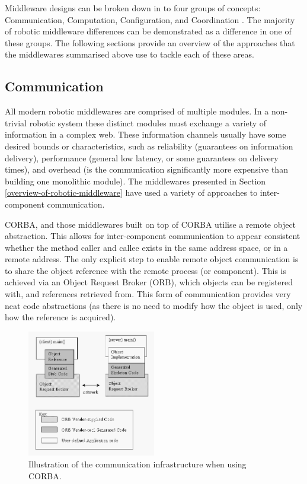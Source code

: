 \documentclass[../dissertation.tex]{subfiles}
\begin{document}

Middleware designs can be broken down in to four groups of concepts: Communication, Computation, Configuration, and Coordination \cite{brugali2010component}. The majority of robotic middleware differences can be demonstrated as a difference in one of these groups. The following sections provide an overview of the approaches that the middlewares summarised above use to tackle each of these areas.

\subsection{Communication}

All modern robotic middlewares are comprised of multiple modules. In a non-trivial robotic system these distinct modules must exchange a variety of information in a complex web. These information channels usually have some desired bounds or characteristics, such as reliability (guarantees on information delivery), performance (general low latency, or some guarantees on delivery times), and overhead (is the communication significantly more expensive than building one monolithic module). The middlewares presented in Section \ref{overview-of-robotic-middleware} have used a variety of approaches to inter-component communication.

CORBA, and those middlewares built on top of CORBA utilise a remote object abstraction. This allows for inter-component communication to appear consistent whether the method caller and callee exists in the same address space, or in a remote address. The only explicit step to enable remote object communication is to share the object reference with the remote process (or component). This is achieved via an Object Request Broker (ORB), which objects can be registered with, and references retrieved from. This form of communication provides very neat code abstractions (as there is no need to modify how the object is used, only how the reference is acquired).

\begin{figure}[H]
\centering
\includegraphics[width=0.5\textwidth]{images/background/Orb.png}
\caption{Illustration of the communication infrastructure when using CORBA\cite{corbaCommunicationWikipediaImage}.}
\end{figure}
\end{document}
